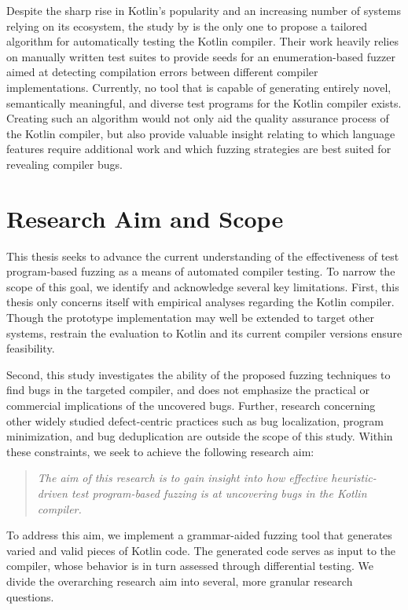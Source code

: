Despite the sharp rise in Kotlin's popularity and an increasing
number of systems relying on its ecosystem, the study by \citet{stepanov2021type}
is the only one to propose a tailored algorithm for automatically 
testing the Kotlin compiler.
Their work heavily relies on manually written test suites to 
provide seeds for an enumeration-based fuzzer aimed at detecting compilation
errors between different compiler implementations. 
Currently, no tool that is capable of generating entirely novel, semantically 
meaningful, and diverse test programs for the Kotlin compiler exists.
Creating such an algorithm would not only aid the quality assurance process
of the Kotlin compiler, but also provide valuable insight relating to
which language features require additional work and which
fuzzing strategies are best suited for revealing compiler bugs.

\section{\label{sec:aim}Research Aim and Scope}

This thesis seeks to advance the current understanding of the
effectiveness of test program-based fuzzing as a means of automated compiler testing.
To narrow the scope of this goal, we identify and acknowledge several
key limitations.
First, this thesis only concerns itself with empirical analyses regarding
the Kotlin compiler. 
Though the prototype implementation may well be 
extended to target other systems, restrain the
evaluation to Kotlin and its current compiler versions ensure feasibility.

Second, this study investigates the ability of the proposed fuzzing
techniques to find bugs in the targeted compiler, and does not emphasize
the practical or commercial implications of the uncovered bugs.
Further, research concerning other widely studied defect-centric 
practices such as bug localization, program minimization, and bug deduplication
are outside the scope of this study.
Within these constraints, we seek to achieve the following research aim:

\begin{quote}
\centering 
\emph{The aim of this research is to gain insight into how 
effective heuristic-driven 
test program-based fuzzing is at uncovering bugs in the
Kotlin compiler.}
\end{quote}

To address this aim, we implement a grammar-aided fuzzing tool
that generates varied and valid pieces of Kotlin code. 
The generated code serves as input to the compiler,
whose behavior is in turn assessed through differential testing.
We divide the overarching research aim into several, more granular
research questions.

